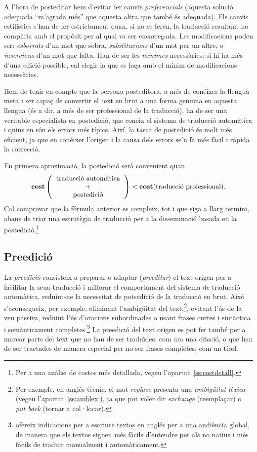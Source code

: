 A l'hora de posteditar hem d'evitar fer canvis \emph{preferencials}
(aquesta solució adequada ``m'agrada més'' que aquesta altra que també
és adequada). Els canvis estilístics s'han de fer estrictament quan,
si no es feren, la traducció resultant no compliria amb el propòsit
per al qual va ser encarregada.  Les modificacions poden ser:
\emph{esborrats} d'un mot que sobra, \emph{substitucions} d'un mot per
un altre, o \emph{insercions} d'un mot que falta. Han de ser les
\emph{mínimes} necessàries: si hi ha més d'una edició possible, cal
elegir la que es faça amb el mínim de modificacions necessàries.

Hem de tenir en compte que la persona posteditora, a més de conéixer
la llengua meta i ser capaç de convertir el text en brut a una forma
genuïna en aquesta llengua (és a dir, a més de ser professional de la
traducció), ha de ser una veritable especialista en postedició, que
coneix el sistema de traducció automàtica i quins en són els errors
més típics. Així, la tasca de postedició és molt més eficient, ja que
en conéixer l'origen i la causa dels errors se'n fa més fàcil i ràpida
la correcció.

En primera aproximació, la postedició serà convenient quan
$$\textbf{cost}\left(\mbox{\begin{tabular}{c}traducció automàtica\\ +\\
      postedició\end{tabular}}\right) <
\textbf{cost}(\mbox{traducció professional}).
$$
\label{pg:cost}
Cal comprovar que la fórmula anterior es compleix, tot i que siga a
llarg termini, abans de triar una estratègia de traducció per a la
disseminació basada en la postedició.\footnote{Per a una anàlisi de
  costos més detallada, vegeu l'apartat~\ref{ss:costdetall}.}

\subsection{Preedició} 
\label{ss:preedicio}
La \emph{preedició} consisteix a preparar o adaptar (\emph{preeditar})
el text origen per a facilitar la seua traducció i millorar el
comportament del sistema de traducció automàtica, reduint-ne la
necessitat de potsedició de la traducció en brut. Això s'aconsegueix,
per exemple, eliminant l'ambigüitat del text,\footnote{Per exemple, en
  anglés tècnic, el mot \emph{replace} presenta una \emph{ambigüitat
    lèxica} (vegeu l'apartat~\ref{ss:amblex}), ja que pot voler dir
  \emph{exchange} (reemplaçar) o \emph{put back} (tornar a
  col·locar).}, evitant l'ús de la veu passiva, reduint l'ús
d'oracions subordinades o usant frases curtes i sintàctica i
semànticament completes.\footnote{\citet{kohl08} ofereix indicacions
  per a escriure textos en anglés per a una audiència global, de
  manera que els textos siguen més fàcils d'entendre per als no natius
  i més fàcils de traduir manualment i automàticament.} La preedició
del text origen es pot fer també per a marcar parts del text que no
han de ser traduïdes, com ara una citació, o que han de ser tractades
de manera especial per no ser frases completes, com un títol.

